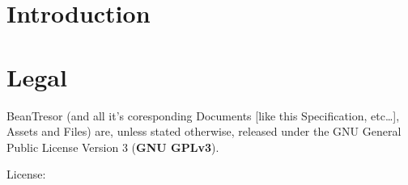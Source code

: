\documentclass[11pt,a4paper,titlepage,portrait,english,final]{scrartcl}
\title{\docTitle}
\subtitle{\docSubtitle}
\author{\large\scshape \docAuthor \\ \large\scshape\textbf{\href{http://kije.ch}{kije-dev}}}
\date{\normalsize\scshape\docDate}
\begin{document}
\maketitle
\newpage
\tableofcontents
\newpage

\section{Introduction}


\section{Legal}
BeanTresor (and all it's coresponding Documents [like this Specification, etc\ldots], Assets and Files) are, unless stated otherwise, released under the GNU General Public License Version 3 (\textbf{GNU GPLv3}).

License:
\end{document}
